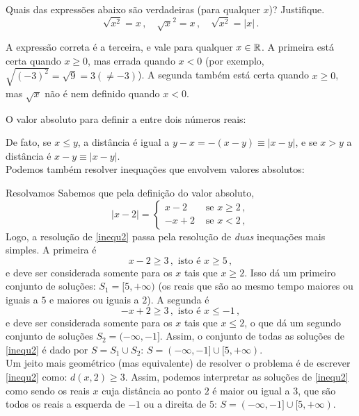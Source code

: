 \begin{exo}\label{Exo:valorabscorreto}
Quais das expressões abaixo são verdadeiras (para qualquer $x$)?
Justifique.  
$$
\sqrt{x^2}=x\,,\quad \sqrt{x}^2=x\,,\quad\sqrt{x^2}=|x|\,.
$$
\begin{sol}
A expressão correta é a terceira, e vale para qualquer $x\in \mathbb{R}$.
A primeira está certa quando $x\geq 0$, mas errada quando $x<0$ (por exemplo, 
$\sqrt{(-3)^2}=\sqrt{9}=3(\neq -3)$). A segunda também está certa quando $x\geq
0$, mas $\sqrt{x}$ não é nem definido quando $x<0$.
\end{sol}
\end{exo}
O valor absoluto para definir 
a  entre dois números reais:
\begin{center}
\begin{bmlimage}\end{bmlimage}
\end{center}
De fato, se $x\leq y$, a distância é igual a $y-x=-(x-y)\equiv |x-y|$, e se
$x>y$ a distância é $x-y\equiv |x-y|$.\\

Podemos também resolver inequações que envolvem valores absolutos:
\begin{ex}\label{Ex:inequmodulo}
Resolvamos
Sabemos que pela definição do valor absoluto,
$$
|x-2|=
\begin{cases}
 x-2&\text{ se }x\geq 2\,,\\
-x+2&\text{ se }x< 2\,,
\end{cases}
$$
 Logo, a resolução de \eqref{inequ2} passa pela resolução de \emph{duas} inequações mais
simples. A primeira é
$$ x-2\geq 3\,, \text{ isto é } x\geq 5\,,$$
e deve ser considerada somente para os $x$ tais que $x\geq 2$. Isso 
dá um primeiro conjunto de soluções: $S_1=[5,+\infty)$ (os reais que são ao mesmo tempo
maiores ou iguais a  $5$ e maiores ou iguais a $2$). A segunda é
$$ -x+2\geq 3\,, \text{ isto é } x\leq -1\,,$$
 e deve ser considerada somente para os $x$ tais que $x\leq 2$, o que dá um segundo
conjunto de soluções $S_2=(-\infty,-1]$. Assim, o conjunto de todas as soluções de
\eqref{inequ2} é dado por $S=S_1\cup S_2$: $S=(-\infty,-1]\cup [5,+\infty)$.\\

Um jeito mais geométrico (mas equivalente) de resolver o problema é de escrever 
\eqref{inequ2} como: $d(x,2)\geq 3$. Assim, podemos
interpretar as soluções de \eqref{inequ2} como sendo os reais $x$ cuja distância ao ponto
$2$ é maior ou igual a $3$, que são todos os reais a {esquerda} de 
$-1$ ou a direita de $5$: $S=(-\infty,-1]\cup [5,+\infty)$.
\end{ex}


